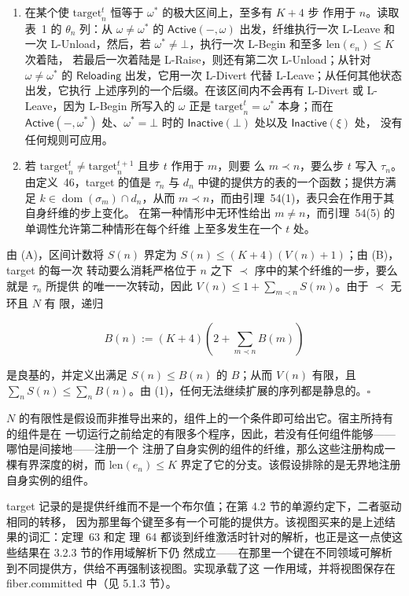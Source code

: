 \begin{enumerate}
\def\labelenumi{(\Alph{enumi})}
\item
  在某个使 \(\mathrm{target}_{n}^{t}\) 恒等于 \(\omega^{*}\) 的极大区间上，至多有 \(K+4\) 步
  作用于 \(n\)。读取表~1 的 \(\theta_{n}\) 列：从 \(\omega \neq \omega^{*}\) 的
  \(\mathsf{Active}(-,\omega)\) 出发，纤维执行一次 L-Leave 和一次 L-Unload，然后，若
  \(\omega^{*} \neq \bot\)，执行一次 L-Begin 和至多 \(\mathrm{len}(e_{n}) \leq K\) 次着陆，
  若最后一次着陆是 L-Raise，则还有第二次 L-Unload；从针对 \(\omega \neq \omega^{*}\) 的
  \(\mathsf{Reloading}\) 出发，它用一次 L-Divert 代替 L-Leave；从任何其他状态出发，它执行
  上述序列的一个后缀。在该区间内不会再有 L-Divert 或 L-Leave，因为 L-Begin 所写入的
  \(\omega\) 正是 \(\mathrm{target}_{n}^{t} = \omega^{*}\) 本身；而在 \(\mathsf{Active}(-,\omega^{*})\)
  处、\(\omega^{*} = \bot\) 时的 \(\mathsf{Inactive}(\bot)\) 处以及 \(\mathsf{Inactive}(\xi)\) 处，
  没有任何规则可应用。
\item
  若 \(\mathrm{target}_{n}^{t} \neq \mathrm{target}_{n}^{t+1}\) 且步 \(t\) 作用于 \(m\)，则要
  么 \(m \prec n\)，要么步 \(t\) 写入 \(\tau_{n}\)。由定义~46，target 的值是 \(\tau_{n}\) 与
  \(d_{n}\) 中键的提供方的表的一个函数；提供方满足 \(k \in \operatorname{dom}(\sigma_{m})
  \cap d_{n}\)，从而 \(m \prec n\)，而由引理~54(1)，表只会在作用于其自身纤维的步上变化。
  在第一种情形中无环性给出 \(m \neq n\)，而引理~54(5) 的单调性允许第二种情形在每个纤维
  上至多发生在一个 \(t\) 处。
\end{enumerate}

由 (A)，区间计数将 \(S(n)\) 界定为 \(S(n) \leq (K+4)(V(n)+1)\)；由 (B)，target 的每一次
转动要么消耗严格位于 \(n\) 之下 \(\prec\) 序中的某个纤维的一步，要么就是 \(\tau_{n}\) 所提供
的唯一一次转动，因此 \(V(n) \leq 1 + \sum_{m \prec n} S(m)\)。由于 \(\prec\) 无环且 \(N\) 有
限，递归

\[
B(n) := (K+4)\left( 2 + \sum_{m \prec n} B(m) \right)
\]

是良基的，并定义出满足 \(S(n) \leq B(n)\) 的 \(B\)；从而 \(V(n)\) 有限，且
\(\sum_{n} S(n) \leq \sum_{n} B(n)\)。由 (1)，任何无法继续扩展的序列都是静息的。\(\square\)

\(N\) 的有限性是假设而非推导出来的，组件上的一个条件即可给出它。宿主所持有的组件是在
一切运行之前给定的有限多个程序，因此，若没有任何组件能够——哪怕是间接地——注册一个
注册了自身实例的组件的纤维，那么这些注册构成一棵有界深度的树，而
\(\mathrm{len}(e_{n}) \leq K\) 界定了它的分支。该假设排除的是无界地注册自身实例的组件。

target 记录的是提供纤维而不是一个布尔值；在第 4.2 节的单源约定下，二者驱动相同的转移，
因为那里每个键至多有一个可能的提供方。该视图买来的是上述结果的词汇：定理~63 和定
理~64 都谈到纤维激活时针对的解析，也正是这一点使这些结果在 3.2.3 节的作用域解析下仍
然成立——在那里一个键在不同领域可解析到不同提供方，供给不再强制该视图。实现承载了这
一作用域，并将视图保存在 fiber.committed 中（见 5.1.3 节）。

